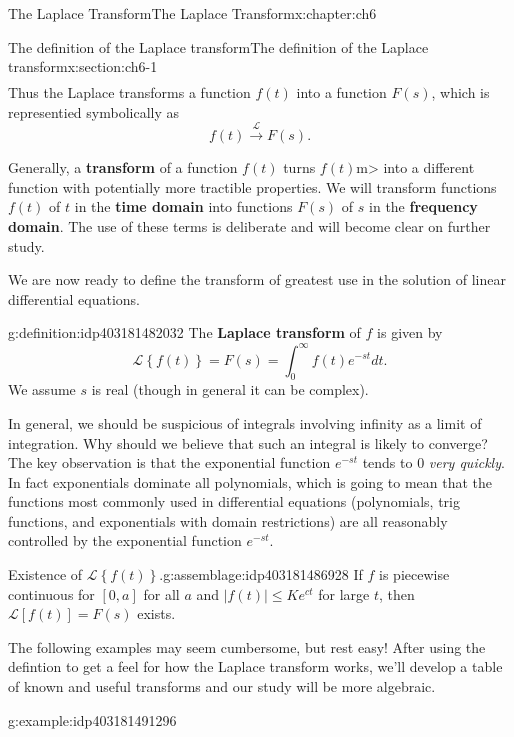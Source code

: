 \documentclass[oneside,10pt,]{book}
\newcommand{\terminology}[1]{\textbf{#1}}
\numberwithin{equation}{section}
\numberwithin{equation}{section}
\begin{document}
\begin{chapterptx}{The Laplace Transform}{}{The Laplace Transform}{}{}{x:chapter:ch6}
\begin{sectionptx}{The definition of the Laplace transform}{}{The definition of the Laplace transform}{}{}{x:section:ch6-1}
\begin{equation*}
\begin{array}{ccc}
\end{array}
\end{equation*}
Thus the Laplace transforms a function \(f(t)\) into a function \(F(s)\), which is representied symbolically as%
\begin{equation*}
f(t)\overset{\mathcal{L}}{\longrightarrow}F(s).
\end{equation*}
%
\par
Generally, a \terminology{transform} of a function \(f(t)\) turns \(f(t)\)m\textgreater{} into a different function with potentially more tractible properties. We will transform functions \(f(t)\) of \(t\) in the \terminology{time domain} into functions \(F(s)\) of \(s\) in the \terminology{frequency domain}. The use of these terms is deliberate and will become clear on further study.%
\par
We are now ready to define the transform of greatest use in the solution of linear differential equations.%
\begin{definition}{}{g:definition:idp403181482032}%
The \terminology{Laplace transform} of \(f\) is given by%
\begin{equation*}
\mathcal{L}\left\{ f(t)\right\} =F(s)=\int_{0}^{\infty}f(t)e^{-st}dt.
\end{equation*}
We assume \(s\) is real (though in general it can be complex).%
\end{definition}
In general, we should be suspicious of integrals involving infinity as a limit of integration. Why should we believe that such an integral is likely to converge? The key observation is that the exponential function \(e^{-st}\) tends to \(0\) \emph{very quickly}. In fact exponentials dominate all polynomials, which is going to mean that the functions most commonly used in differential equations (polynomials, trig functions, and exponentials with domain restrictions) are all reasonably controlled by the exponential function \(e^{-st}\).%
\begin{assemblage}{Existence of \(\mathcal{L}\left\{ f(t)\right\} \).}{g:assemblage:idp403181486928}%
If \(f\) is piecewise continuous for \(\left[0,a\right]\) for all \(a\) and            \(\left|f(t)\right|\leq Ke^{ct}\) for large \(t\), then \(\mathcal{L}\left[f(t)\right]=F(s)\) exists.%
\end{assemblage}
The following examples may seem cumbersome, but rest easy! After using the defintion to get a feel for how the Laplace transform works, we'll develop a table of known and useful transforms and our study will be more algebraic.%
\begin{example}{}{g:example:idp403181491296}%

\end{example}
\end{sectionptx}
\end{chapterptx}
\end{document}

